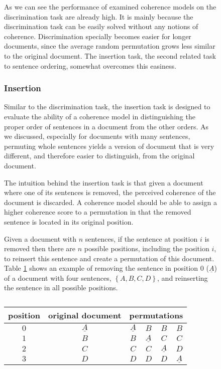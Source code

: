 \begin{figure}[!t]
As we can see the performance of examined coherence models on the discrimination task are already high. 
It is mainly because the discrimination task can be easily solved without any notions of coherence. 
Discrimination specially becomes easier for longer documents, since the average random permutation grows less similar to the original document. 
The insertion task, the second related task to sentence ordering, somewhat overcomes this easiness. 


\subsubsection{Insertion}
%
Similar to the discrimination task, the insertion task \cite{chenerdong07} is designed to evaluate the ability of a coherence model in distinguishing the proper order of sentences in a document from the other orders. 
As we discussed, especially for documents with many sentences, permuting whole sentences yields a version of document that is very different, and therefore easier to distinguish, from the original document. 

The intuition behind the insertion task is that given a document where one of its sentences is removed, the perceived coherence 
of the document is discarded. 
A coherence model should be able to assign a higher coherence score to a permutation in that the removed sentence is located in its original position. 

Given a document with $n$ sentences, if the sentence at position $i$ is removed then there are $n$ possible positions, including the position $i$, to reinsert this sentence and create a permutation of this document. 
Table \ref{table:insertion_task} shows an example of removing the sentence in position $0$ ($\underline{A}$) of a document with four sentences, $\left \{ A, B, C, D \right \}$, and reinserting the sentence in all possible positions. 
 

\begin{table}[!ht]
\centering
\begin{small}
\begin{tabular}{cc|cccc}
position & original document  & \multicolumn{4}{c}{permutations}\\
\hline
$0$ & $\underline{A}$ & $\underline{A}$ & $B$ & $B$ & $B$\\
$1$ & $B$ 			  & $B$  & $\underline{A}$ & $C$ & $C$\\
$2$ & $C$			  & $C$ & $C$ & $\underline{A}$ & $D$\\
$3$ & $D$			  & $D$ & $D$ & $D$ & $\underline{A}$\\
\end{tabular}
\end{small}
\caption{}
\label{table:insertion_task}  
\end{table}


\end{figure}
